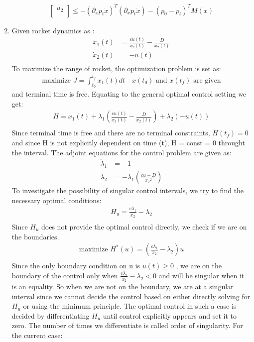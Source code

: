 \begin{enumerate}
\begin{align*}
\begin{bmatrix}
                   u_2 \\
                  \end{bmatrix} \le - (\partial_x p_t \dot x)^T (\partial_x p_t \dot x) - (p_0 - p_t)^T M(x)
  \end{align*}
\item Given rocket dynamics as :
\begin{align*}
 \dot x_1(t) &= \frac{cu(t)}{x_2(t)} - \frac{D}{x_2(t)} \\
 \dot x_2(t) &= - u(t) \\
\end{align*}
 To maximize the range of rocket, the optimization problem is set as:
 \begin{align*}
   \mbox{maximize }J = \int_{t_0}^{t_f} x_1(t) dt \quad x(t_0) \mbox{ and } x(t_f) \mbox{ are given}
 \end{align*}
 and terminal time is free. Equating to the general optimal control setting we get:
 \begin{align*}
  H = x_1(t) + \lambda_1( \frac{cu(t)}{x_2(t)} - \frac{D}{x_2(t)} ) + \lambda_2 ( - u(t)) \\
 \end{align*}
 Since terminal time is free and there are no terminal constraints, $H(t_f) = 0$ and since H is not explicitly dependent on time (t), H = const = 0 throught the interval.
 The adjoint equations for the control problem are given as:
 \begin{align*}
  \dot \lambda_1 &= - 1 \\
  \dot \lambda_2 &= -\lambda_1\left(\frac{cu - D}{{x_2}^2}\right)
 \end{align*}
 To investigate the possibility of singular control intervals, we try to find the necessary optimal conditions:
 \begin{align*}
  H_u = \frac{c \lambda_1}{x_2} - \lambda_2\\
 \end{align*}
 Since $H_u$ does not provide the optimal control directly, we check if we are on the boundaries.
 \begin{align*}
  \mbox{maximize }H^*(u) = \left(\frac{c \lambda_1}{x_2} - \lambda_2\right) u \\
 \end{align*}
 Since the only boundary condition on u is $u(t) \ge 0$ , we are on the boundary of the control only when $\frac{c \lambda_1}{x_2} - \lambda_2 < 0$ and will be singular when it is an equality. So when we are not on the boundary, we are at a singular interval since we cannot decide the control based on either directly solving for $H_u$ or using the minimum principle. The optimal control in such a case is decided by differentiating $H_u$ until control explicitly appears and set it to zero. The number of times we differentiate is called order of singularity. For the current case:

\end{enumerate}
